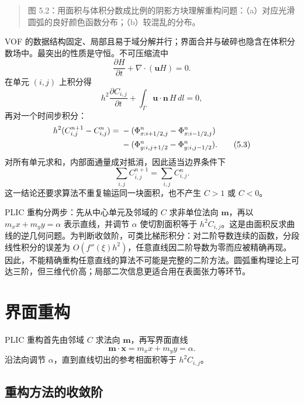 \documentclass[11pt,a4paper,openany,fontset=none]{ctexbook}
\begin{document}
\begin{quote}\small 图 5.2：用面积与体积分数成比例的阴影方块理解重构问题：（a）对应光滑圆弧的良好颜色函数分布；（b）较混乱的分布。\end{quote}
VOF 的数据结构固定、局部且易于域分解并行；界面合并与破碎也隐含在体积分数场中。最突出的性质是守恒。不可压缩流中
\begin{equation}
\frac{\partial H}{\partial t}+\nabla\cdot(\bm uH)=0.
\tag{5.1}
\end{equation}
在单元 $(i,j)$ 上积分得
\begin{equation}
h^2\frac{\partial C_{i,j}}{\partial t}
+\int_{\Gamma}\bm u\cdot\bm n\,H\,dl=0,
\tag{5.2}
\end{equation}
再对一个时间步积分：
\begin{align}
h^2(C_{i,j}^{n+1}-C_{i,j}^{n})={}&
-(\Phi^n_{x:i+1/2,j}-\Phi^n_{x:i-1/2,j})\notag\\
&-(\Phi^n_{y:i,j+1/2}-\Phi^n_{y:i,j-1/2}).
\tag{5.3}
\end{align}
对所有单元求和，内部面通量成对抵消，因此适当边界条件下
\begin{equation}
\sum_{i,j}C_{i,j}^{n+1}=\sum_{i,j}C_{i,j}^{n}.
\tag{5.4}
\end{equation}
这一结论还要求算法不重复输运同一块面积，也不产生 $C>1$ 或 $C<0$。

PLIC 重构分两步：先从中心单元及邻域的 $C$ 求非单位法向 $\bm m$，再以 $m_xx+m_yy=\alpha$ 表示直线，并调节 $\alpha$ 使切割面积等于 $h^2C_{i,j}$。这是由面积反求曲线的逆几何问题。为判断收敛阶，可类比梯形积分：对二阶导数连续的函数，分段线性积分的误差为 $O(f''(\xi)h^2)$，任意直线因二阶导数为零而应被精确再现。因此，不能精确重构任意直线的算法不可能是完整的二阶方法。圆弧重构理论上可达三阶，但三维代价高；局部二次信息更适合用在表面张力等环节。

\section{界面重构}

PLIC 重构首先由邻域 $C$ 求法向 $\bm m$，再写界面直线
\begin{equation}
\bm m\cdot\bm x=m_xx+m_yy=\alpha.
\tag{5.5}
\end{equation}
沿法向调节 $\alpha$，直到直线切出的参考相面积等于 $h^2C_{i,j}$。

\subsection{重构方法的收敛阶}
\end{document}

